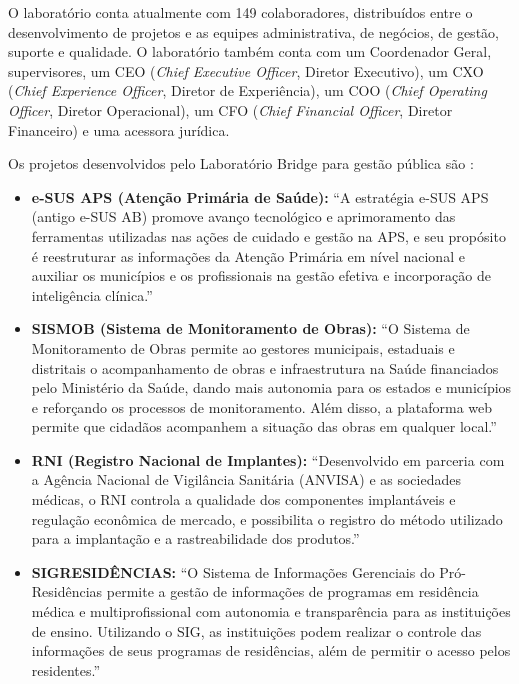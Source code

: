\documentclass[
    12pt,       %
    openright,      %
    twoside,      %
    a4paper,      %
    english,      %
    french,       %
    spanish,      %
    brazil,       %
    ]{abntex2}
\begin{document}
O laboratório conta atualmente com 149 colaboradores, distribuídos entre o desenvolvimento de projetos e as equipes administrativa, de negócios, de gestão, suporte e qualidade. O laboratório também conta com um Coordenador Geral, supervisores, um CEO (\textit{Chief Executive Officer}, Diretor Executivo), um CXO (\textit{Chief Experience Officer}, Diretor de Experiência), um COO (\textit{Chief Operating Officer}, Diretor Operacional), um CFO (\textit{Chief Financial Officer}, Diretor Financeiro) e uma acessora jurídica.

Os projetos desenvolvidos pelo Laboratório Bridge para gestão pública são \cite{Bridge:2022}:
\begin{itemize}
    \item \textbf{e-SUS APS (Atenção Primária de Saúde):} ``A estratégia e-SUS APS (antigo e-SUS AB) promove avanço tecnológico e aprimoramento das ferramentas utilizadas nas ações de cuidado e gestão na APS, e seu propósito é reestruturar as informações da Atenção Primária em nível nacional e auxiliar os municípios e os profissionais na gestão efetiva e incorporação de inteligência clínica.''
    
    \item \textbf{SISMOB (Sistema de Monitoramento de Obras):} ``O Sistema de Monitoramento de Obras permite ao gestores municipais, estaduais e distritais o acompanhamento de obras e infraestrutura na Saúde financiados pelo Ministério da Saúde, dando mais autonomia para os estados e municípios e reforçando os processos de monitoramento. Além disso, a plataforma web permite que cidadãos acompanhem a situação das obras em qualquer local.''
    
    \item \textbf{RNI (Registro Nacional de Implantes):} ``Desenvolvido em parceria com a Agência Nacional de Vigilância Sanitária (ANVISA) e as sociedades médicas, o RNI controla a qualidade dos componentes implantáveis e regulação econômica de mercado, e possibilita o registro do método utilizado para a implantação e a rastreabilidade dos produtos.''
    
    \item \textbf{SIGRESIDÊNCIAS:} ``O Sistema de Informações Gerenciais do Pró-Residências permite a gestão de informações de programas em residência médica e multiprofissional com autonomia e transparência para as instituições de ensino. Utilizando o SIG, as instituições podem realizar o controle das informações de seus programas de residências, além de permitir o acesso pelos residentes.''
    

\end{itemize}
\end{document}
